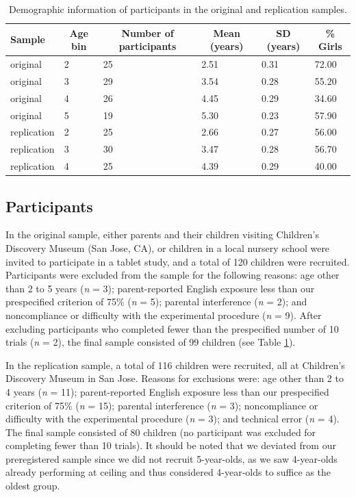 \documentclass[mask,man]{apa6}
\begin{document}
\begin{table}[tbp]
\begin{center}
\begin{threeparttable}
\caption{\label{tab:participantsummarytab}Demographic information of participants in the original and replication samples.}
\begin{tabular}{llllll}
\toprule
Sample & \multicolumn{1}{c}{Age bin} & \multicolumn{1}{c}{Number of participants} & \multicolumn{1}{c}{Mean (years)} & \multicolumn{1}{c}{SD (years)} & \multicolumn{1}{c}{\% Girls}\\
\midrule
original & 2 & 25 & 2.51 & 0.31 & 72.00\\
original & 3 & 29 & 3.54 & 0.28 & 55.20\\
original & 4 & 26 & 4.45 & 0.29 & 34.60\\
original & 5 & 19 & 5.30 & 0.23 & 57.90\\
replication & 2 & 25 & 2.66 & 0.27 & 56.00\\
replication & 3 & 30 & 3.47 & 0.28 & 56.70\\
replication & 4 & 25 & 4.39 & 0.29 & 40.00\\
\bottomrule
\end{tabular}
\end{threeparttable}
\end{center}
\end{table}

\subsection{Participants}\label{participants}

In the original sample, either parents and their children visiting
Children's Discovery Museum (San Jose, CA), or children in a local
nursery school were invited to participate in a tablet study, and a
total of 120 children were recruited. Participants were excluded from
the sample for the following reasons: age other than 2 to 5 years
(\emph{n} = 3); parent-reported English exposure less than our
prespecified criterion of 75\% (\emph{n} = 5); parental interference
(\emph{n} = 2); and noncompliance or difficulty with the experimental
procedure (\emph{n} = 9). After excluding participants who completed
fewer than the prespecified number of 10 trials (\emph{n} = 2), the
final sample consisted of 99 children (see Table
\ref{tab:participantsummarytab}).

In the replication sample, a total of 116 children were recruited, all
at Children's Discovery Museum in San Jose. Reasons for exclusions were:
age other than 2 to 4 years (\emph{n} = 11); parent-reported English
exposure less than our prespecified criterion of 75\% (\emph{n} = 15);
parental interference (\emph{n} = 3); noncompliance or difficulty with
the experimental procedure (\emph{n} = 3); and technical error (\emph{n}
= 4). The final sample consisted of 80 children (no participant was
excluded for completing fewer than 10 trials). It should be noted that
we deviated from our preregistered sample since we did not recruit
5-year-olds, as we saw 4-year-olds already performing at ceiling and
thus considered 4-year-olds to suffice as the oldest group.
\end{document}
